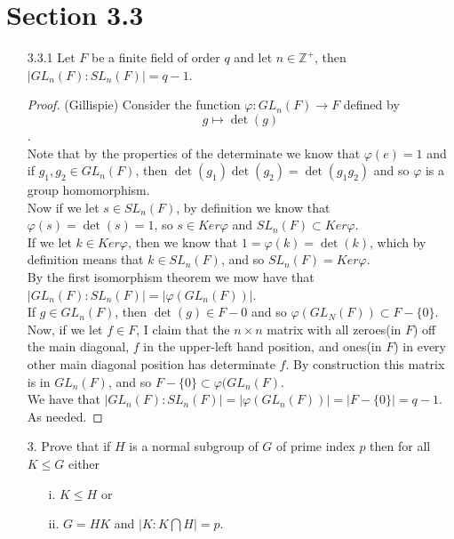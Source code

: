 \documentclass[10pt]{article}
\newcommand{\Z}{\mathbb{Z}}
\renewcommand{\phi}{\varphi}
\begin{document}
\section*{Section 3.3}

\begin{itemize}

\item[3.3.1]  Let $F$ be a finite field of order $q$  and let $n \in \Z^+$, then $|GL_n (F):SL_n (F)|=q-1$.

\begin{proof}(Gillispie) Consider the function $\phi:GL_n (F) \rightarrow F$ defined by \[ g \mapsto \det (g)\].\\
Note that by the properties of the determinate we know that $\phi(e)=1$  and if $g_1,g_2 \in GL_n (F)$, then $\det(g_1 )\det(g_2)=\det(g_1 g_2 )$ and so $\phi$  is a group homomorphism.\\
Now if we let $s\in SL_n (F)$, by definition we know that $\phi(s)=\det(s)=1$, so $s\in Ker\phi$ and $SL_n (F)\subset Ker\phi$.\\
If we let $k\in Ker\phi$, then we know that $1=\phi(k)=\det(k)$, which by definition means that $k\in SL_n (F)$, and so $SL_n (F)=Ker\phi$.\\
By the first isomorphism theorem we mow have that $|GL_n (F):SL_n (F)|=|\phi(GL_n (F))|$.\\
If $g\in GL_n (F)$, then $\det(g)\in F-{0}$ and so $\phi(GL_N(F))\subset F-\{0\}$. Now, if we let $f\in F$, I claim that the $n\times n$ matrix with all zeroes(in $F$) off the main diagonal, $f$  in the upper-left hand position, and ones(in $F$) in every other main diagonal position has determinate $f$. By construction this matrix is in $GL_n (F)$, and so $F-\{0\}\subset \phi(GL_n (F)$.\\
We have that $|GL_n (F):SL_n (F)|=|\phi(GL_n (F))|=|F-\{0\}|=q-1$.
As needed.

\end{proof}

\item[3.] Prove that if $H$ is a normal subgroup of $G$ of prime index $p$ then for all $K \leq G$ either \\
\begin{itemize}
\item[i.] $K\leq H$ or

\item[ii.] $G = HK$ and $|K: K\bigcap H| = p$.

\end{itemize}


\end{itemize}
\end{document}
